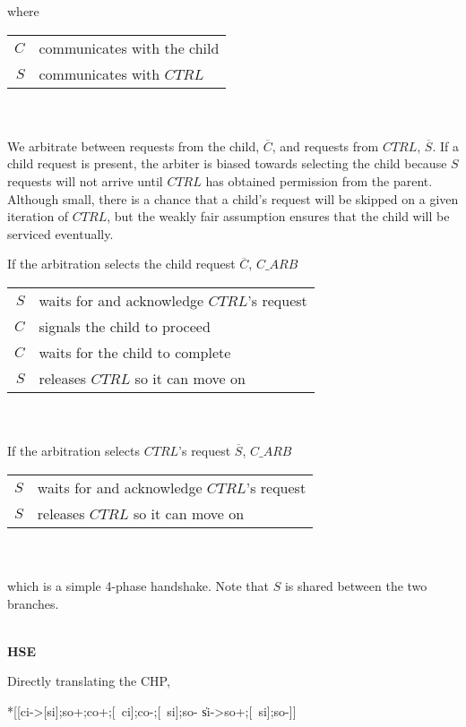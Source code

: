 \documentclass[aer.tex]{subfiles}
\begin{document}
\noindent where 

\begin{tabular}[]{rl}
  $C$ & communicates with the child \\ 
  $S$ & communicates with $CTRL$ \\
\end{tabular} \\ \\

We arbitrate between requests from the child, $\overline{C}$, and 
requests from $CTRL$, $\overline{S}$. If a child request is present, the arbiter is biased towards selecting the child because $S$ requests will not arrive until $CTRL$ has obtained permission from the parent. Although small, there is a chance that a child's request will be skipped on a given iteration of $CTRL$, but the weakly fair assumption ensures that the child will be serviced eventually.

\noindent If the arbitration selects the child request $\overline{C}$, $C\!\_ARB$

\begin{tabular}[]{rl}
  $S$ & waits for and acknowledge $CTRL$'s request \\
  $C$ & signals the child to proceed \\
  $C$ & waits for the child to complete \\
  $S$ & releases $CTRL$ so it can move on \\
\end{tabular} \\ \\

\noindent If the arbitration selects $CTRL$'s request $\overline{S}$, $C\!\_ARB$

\begin{tabular}[]{rl}
  $S$ & waits for and acknowledge $CTRL$'s request \\
  $S$ & releases $CTRL$ so it can move on \\
\end{tabular} \\ \\

\noindent which is a simple 4-phase handshake. Note that $S$ is shared between the two branches.

\noindent \\ \textbf{HSE}

\noindent Directly translating the CHP,

\begin{hse}
*[[ci->[si];so+;co+;[~ci];co-;[~si];so-
  \|si->so+;[~si];so-]]
\end{hse}
\end{document}

